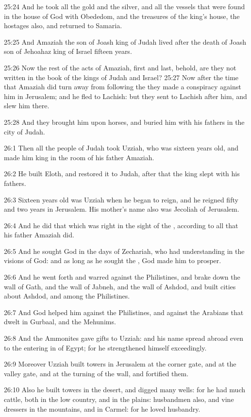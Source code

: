 25:24 And he took all the gold and the silver, and all the vessels
that were found in the house of God with Obededom, and the treasures
of the king's house, the hostages also, and returned to Samaria.

25:25 And Amaziah the son of Joash king of Judah lived after the death
of Joash son of Jehoahaz king of Israel fifteen years.

25:26 Now the rest of the acts of Amaziah, first and last, behold, are
they not written in the book of the kings of Judah and Israel?  25:27
Now after the time that Amaziah did turn away from following the \LORD
they made a conspiracy against him in Jerusalem; and he fled to
Lachish: but they sent to Lachish after him, and slew him there.

25:28 And they brought him upon horses, and buried him with his
fathers in the city of Judah.

26:1 Then all the people of Judah took Uzziah, who was sixteen years
old, and made him king in the room of his father Amaziah.

26:2 He built Eloth, and restored it to Judah, after that the king
slept with his fathers.

26:3 Sixteen years old was Uzziah when he began to reign, and he
reigned fifty and two years in Jerusalem. His mother's name also was
Jecoliah of Jerusalem.

26:4 And he did that which was right in the sight of the \LORD,
according to all that his father Amaziah did.

26:5 And he sought God in the days of Zechariah, who had understanding
in the visions of God: and as long as he sought the \LORD, God made him
to prosper.

26:6 And he went forth and warred against the Philistines, and brake
down the wall of Gath, and the wall of Jabneh, and the wall of Ashdod,
and built cities about Ashdod, and among the Philistines.

26:7 And God helped him against the Philistines, and against the
Arabians that dwelt in Gurbaal, and the Mehunims.

26:8 And the Ammonites gave gifts to Uzziah: and his name spread
abroad even to the entering in of Egypt; for he strengthened himself
exceedingly.

26:9 Moreover Uzziah built towers in Jerusalem at the corner gate, and
at the valley gate, and at the turning of the wall, and fortified
them.

26:10 Also he built towers in the desert, and digged many wells: for
he had much cattle, both in the low country, and in the plains:
husbandmen also, and vine dressers in the mountains, and in Carmel:
for he loved husbandry.

